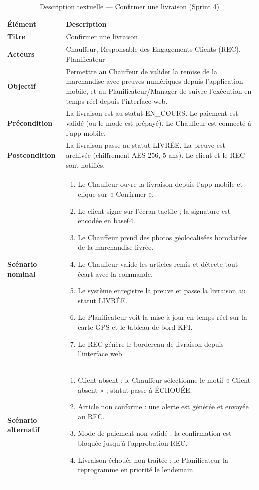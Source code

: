 \captionsetup[longtable]{justification=centering}
\setlength{\arrayrulewidth}{1pt}
\begin{longtable}{|p{4cm}|p{11cm}|}
\hline
\rowcolor{headerbg}
\textbf{Élément} & \textbf{Description} \\
\hline
\textbf{Titre} & Confirmer une livraison \\
\hline
\textbf{Acteurs} & Chauffeur, Responsable des Engagements Clients (REC), Planificateur \\
\hline
\textbf{Objectif} & Permettre au Chauffeur de valider la remise de la marchandise avec preuves numériques depuis l'application mobile, et au Planificateur/Manager de suivre l'exécution en temps réel depuis l'interface web. \\
\hline
\textbf{Précondition} & La livraison est au statut EN\_COURS. Le paiement est validé (ou le mode est prépayé). Le Chauffeur est connecté à l'app mobile. \\
\hline
\textbf{Postcondition} & La livraison passe au statut LIVRÉE. La preuve est archivée (chiffrement AES-256, 5 ans). Le client et le REC sont notifiés. \\
\hline
\textbf{Scénario nominal} &
\begin{enumerate}[start=1, label=\arabic*., nosep, leftmargin=1.4em]
    \item Le Chauffeur ouvre la livraison depuis l'app mobile et clique sur « Confirmer ».
    \item Le client signe sur l'écran tactile ; la signature est encodée en base64.
    \item Le Chauffeur prend des photos géolocalisées horodatées de la marchandise livrée.
    \item Le Chauffeur valide les articles remis et détecte tout écart avec la commande.
    \item Le système enregistre la preuve et passe la livraison au statut LIVRÉE.
    \item Le Planificateur voit la mise à jour en temps réel sur la carte GPS et le tableau de bord KPI.
    \item Le REC génère le bordereau de livraison depuis l'interface web.
\end{enumerate} \\
\hline
\textbf{Scénario alternatif} &
\begin{enumerate}[start=1, label=\arabic*., nosep, leftmargin=1.4em]
    \item Client absent : le Chauffeur sélectionne le motif « Client absent » ; statut passe à ÉCHOUÉE.
    \item Article non conforme : une alerte est générée et envoyée au REC.
    \item Mode de paiement non validé : la confirmation est bloquée jusqu'à l'approbation REC.
    \item Livraison échouée non traitée : le Planificateur la reprogramme en priorité le lendemain.
\end{enumerate} \\
\hline
\caption{Description textuelle --- Confirmer une livraison (Sprint 4)}
\end{longtable}
\setlength{\arrayrulewidth}{0.4pt}

